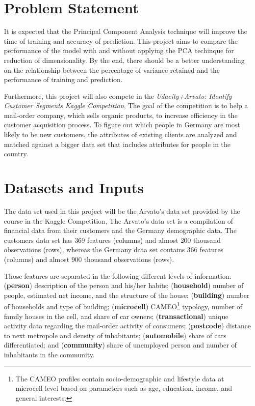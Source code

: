 \documentclass[10pt,twoside,twocolumn,nofonttune,a4paper,journal,compsoc,english,french,spanish]{IEEEtran}
\begin{document}
\hypertarget{problem-statement}{%
\section{Problem Statement}\label{problem-statement}}

It is expected that the Principal Component Analysis technique will
improve the time of training and accuracy of prediction. This project
aims to compare the performance of the model with and without applying
the PCA techinque for reduction of dimensionality. By the end, there
should be a better understanding on the relationship between the
percentage of variance retained and the performance of training and
prediction.

Furthermore, this project will also compete in the \emph{Udacity+Arvato:
Identify Customer Segments Kaggle
Competition}\cite{arvato_kaggle_competition}, The goal of the
competition is to help a mail-order company, which sells organic
products, to increase efficiency in the customer acquisition process. To
figure out which people in Germany are most likely to be new customers,
the attributes of existing clients are analyzed and matched against a
bigger data set that includes attributes for people in the country.

\hypertarget{datasets-and-inputs}{%
\section{Datasets and Inputs}\label{datasets-and-inputs}}

The data set used in this project will be the Arvato's data set provided
by the course in the Kaggle Competition\cite{arvato_kaggle_competition},
The Arvato's data set is a compilation of financial data from their
customers and the Germany demographic data. The customers data set has
369 features (columns) and almost 200 thousand observations (rows),
whereas the Germany data set contains 366 features (columns) and almost
900 thousand observations (rows).

Those features are separated in the following different levels of
information: (\textbf{person}) description of the person and his/her
habits; (\textbf{household}) number of people, estimated net income, and
the structure of the house; (\textbf{building}) number of households and
type of building; (\textbf{microcell}) CAMEO\footnote{The CAMEO profiles
  contain socio-demographic and lifestyle data at microcell level based
  on parameters such as age, education, income, and general interests.}
typology, number of family houses in the cell, and share of car owners;
(\textbf{transactional}) unique activity data regarding the mail-order
activity of consumers; (\textbf{postcode}) distance to next metropole
and density of inhabitants; (\textbf{automobile}) share of cars
differentiated; and (\textbf{community}) share of unemployed person and
number of inhabitants in the community.
\end{document}
